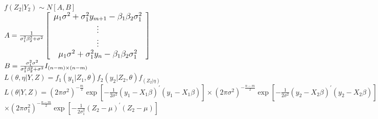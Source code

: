 \documentclass{article}\usepackage[]{graphicx}\usepackage[]{color}
\begin{document}
$f(Z_{2}|Y_{2})\sim N[A,B]$
\vspace{5mm}\\
$\large{A}=\frac{1}{\sigma^{2}_{1}\beta_{2}^{2}+\sigma^{2}}\left[\begin{array}{c} \mu_{1}\sigma^{2}+\sigma_{1}^{2}y_{m+1}-\beta_{1}\beta_{2}\sigma_{1}^{2}\\ \vdots \\ \vdots \\ \mu_{1}\sigma^{2}+\sigma_{1}^{2}y_{n}-\beta_{1}\beta_{2}\sigma_{1}^{2} \end{array} \right]$
\vspace{7mm}\\
$B=\frac{\sigma^{2}_{1}\sigma^{2}}{\sigma^{2}_{1}\beta_{2}^{2}+\sigma^{2}}\Huge{I_{(n-m)\times(n-m)}}$\vspace{5mm}\\


$L(\theta,\eta|Y,Z)=f_{1}(y_{1}|Z_{1},\theta)f_{2}(y_{2}|Z_{2},\theta)f_(Z_{2}|\eta)$\vspace{5mm}\\

$L(\theta|Y,Z)=(2\pi\sigma^2)^{-\frac{m}{2}}\exp[-\frac{1}{2\sigma^2}(y_{1}-X_{1}\beta)^{\prime}(y_{1}-X_{1}\beta)]\times(2\pi\sigma^2)^{-\frac{n-m}{2}}\exp[-\frac{1}{2\sigma^2}(y_{2}-X_{2}\beta)^{\prime}(y_{2}-X_{2}\beta)]$\hspace{10mm}\\
$\times (2\pi\sigma^2_{1})^{-\frac{n-m}{2}}\exp[-\frac{1}{2\sigma^2_{1}}(Z_{2}-\mu)^{\prime}(Z_{2}-\mu)]$\\
\end{document}
